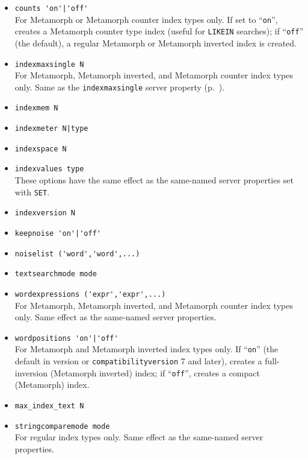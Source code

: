 \begin{itemize}
  \item \verb`counts 'on'|'off'` \\

    For Metamorph or Metamorph counter index types only.  If set to
    ``\verb`on`'', creates a Metamorph counter type index (useful for
    \verb`LIKEIN` searches); if ``\verb`off`'' (the default), a
    regular Metamorph or Metamorph inverted index is created.

  \item \verb`indexmaxsingle N` \\

    For Metamorph, Metamorph inverted, and Metamorph counter index
    types only.  Same as the {\tt indexmaxsingle} server property
    (p.~\pageref{indexmaxsingle}).

  \item \verb`indexmem N` \\
  \item \verb`indexmeter N|type` \\
  \item \verb`indexspace N` \\
  \item \verb`indexvalues type` \\

    These options have the same effect as the same-named server
    properties set with {\tt SET}.

  \item \verb`indexversion N` \\
  \item \verb`keepnoise 'on'|'off'` \\
  \item \verb`noiselist ('word','word',...)` \\
  \item \verb`textsearchmode mode` \\
  \item \verb`wordexpressions ('expr','expr',...)` \\

    For Metamorph, Metamorph inverted, and Metamorph counter index
    types only.  Same effect as the same-named server properties.

  \item \verb`wordpositions 'on'|'off'` \\

    For Metamorph and Metamorph inverted index types only.  If
    ``\verb`on`'' (the default in version or
    \verb`compatibilityversion` 7 and later), creates a full-inversion
    (Metamorph inverted) index; if ``\verb`off`'', creates a compact
    (Metamorph) index.

  \item \verb`max_index_text N` \\
  \item \verb`stringcomparemode mode` \\

    For regular index types only.  Same effect as the same-named
    server properties.
\end{itemize}

